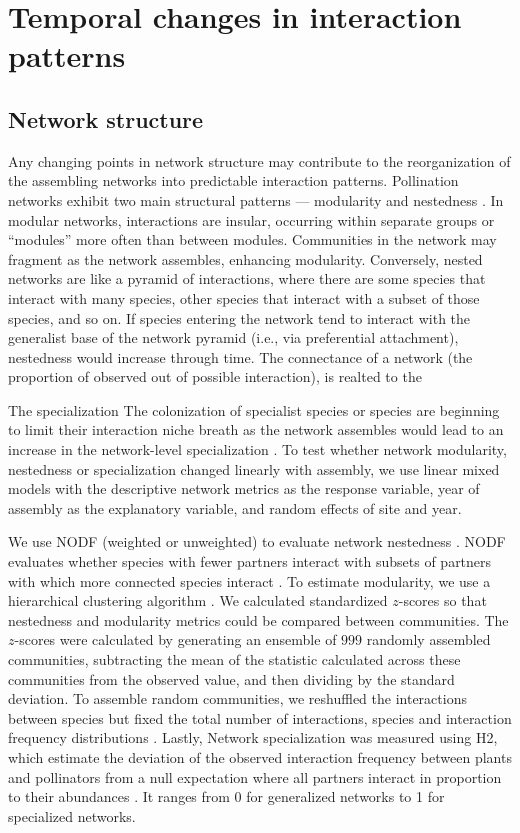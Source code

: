 \documentclass[12pt]{article}
\begin{document}
\section*{Temporal changes in interaction patterns}

\subsection*{Network structure}
Any changing points in network structure may contribute to the
reorganization of the assembling networks into predictable interaction
patterns. Pollination networks exhibit two main structural patterns
--- modularity \citep[e.g.,][]{Olesen2007} and nestedness
\citep[e.g.,][]{Bascompte2006, Bascompte2003}. In modular networks,
interactions are insular, occurring within separate groups or
``modules'' more often than between modules. Communities in the
network may fragment as the network assembles, enhancing
modularity. Conversely, nested networks are like a pyramid of
interactions, where there are some species that interact with many
species, other species that interact with a subset of those species,
and so on. If species entering the network tend to interact with the
generalist base of the network pyramid (i.e., via preferential
attachment), nestedness would increase through time. The connectance
of a network (the proportion of observed out of possible interaction),
is realted to the 

The specialization 
The colonization of specialist species or species are beginning to
limit their interaction niche breath as the network assembles would
lead to an increase in the network-level specialization
\citep{bluthgen-2006-9}. To test whether network modularity,
nestedness or specialization changed linearly with assembly, we use
linear mixed models with the descriptive network metrics as the
response variable, year of assembly as the explanatory variable, and
random effects of site and year.

We use NODF (weighted or unweighted) to evaluate network nestedness
\citep{nodf}. NODF evaluates whether species with fewer partners
interact with subsets of partners with which more connected species
interact \citep{nodf}. To estimate modularity, we use a hierarchical
clustering algorithm \citep{Newman2004, igraph}.  We calculated
standardized $z$-scores so that nestedness and modularity metrics
could be compared between communities. The $z$-scores were calculated
by generating an ensemble of $999$ randomly assembled communities,
subtracting the mean of the statistic calculated across these
communities from the observed value, and then dividing by the standard
deviation. To assemble random communities, we reshuffled the
interactions between species but fixed the total number of
interactions, species and interaction frequency distributions
\citep{Galeano2009}. Lastly, Network specialization was measured using
H2, which estimate the deviation of the observed interaction frequency
between plants and pollinators from a null expectation where all
partners interact in proportion to their abundances
\citep{bluthgen-2006-9}. It ranges from 0 for generalized networks to
1 for specialized networks.
\end{document}
